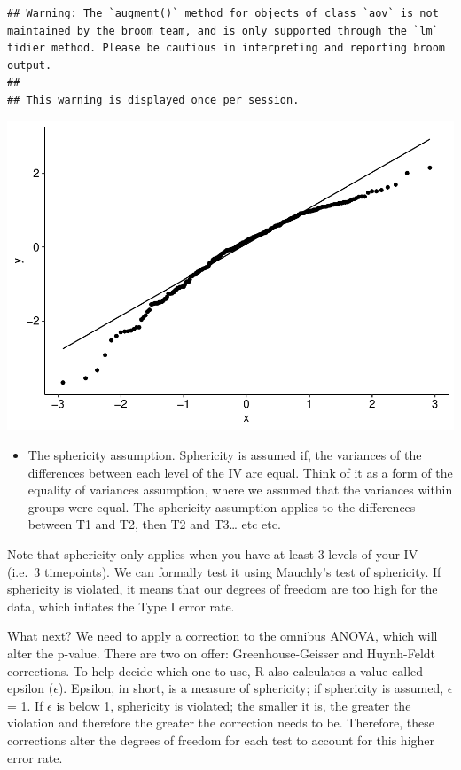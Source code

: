 \documentclass[
]{book}
\providecommand{\tightlist}{%
  \setlength{\itemsep}{0pt}\setlength{\parskip}{0pt}}
\begin{document}
\begin{verbatim}
## Warning: The `augment()` method for objects of class `aov` is not maintained by the broom team, and is only supported through the `lm` tidier method. Please be cautious in interpreting and reporting broom output.
## 
## This warning is displayed once per session.
\end{verbatim}

\includegraphics{_main_files/figure-latex/unnamed-chunk-188-1.pdf}

\begin{itemize}
\tightlist
\item
  The sphericity assumption. Sphericity is assumed if, the variances of the differences between each level of the IV are equal. Think of it as a form of the equality of variances assumption, where we assumed that the variances within groups were equal. The sphericity assumption applies to the differences between T1 and T2, then T2 and T3\ldots{} etc etc.
\end{itemize}

Note that sphericity only applies when you have at least 3 levels of your IV (i.e.~3 timepoints). We can formally test it using Mauchly's test of sphericity. If sphericity is violated, it means that our degrees of freedom are too high for the data, which inflates the Type I error rate.

What next? We need to apply a correction to the omnibus ANOVA, which will alter the p-value. There are two on offer: Greenhouse-Geisser and Huynh-Feldt corrections. To help decide which one to use, R also calculates a value called epsilon (\(\epsilon\)). Epsilon, in short, is a measure of sphericity; if sphericity is assumed, \(\epsilon\) = 1. If \(\epsilon\) is below 1, sphericity is violated; the smaller it is, the greater the violation and therefore the greater the correction needs to be. Therefore, these corrections alter the degrees of freedom for each
test to account for this higher error rate.
\end{document}
